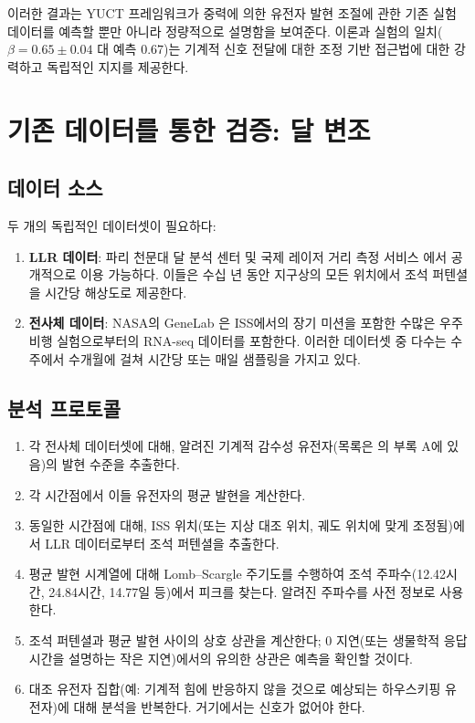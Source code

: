 \documentclass[12pt,a4paper]{article}
\theoremstyle{remark}
\begin{document}
	이러한 결과는 YUCT 프레임워크가 중력에 의한 유전자 발현 조절에 관한 기존 실험 데이터를 예측할 뿐만 아니라 정량적으로 설명함을 보여준다. 이론과 실험의 일치(\(\beta = 0.65 \pm 0.04\) 대 예측 \(0.67\))는 기계적 신호 전달에 대한 조정 기반 접근법에 대한 강력하고 독립적인 지지를 제공한다.
	
	\section{기존 데이터를 통한 검증: 달 변조}
	\label{sec:verification}
	
	\subsection{데이터 소스}
	
	두 개의 독립적인 데이터셋이 필요하다:
	
	\begin{enumerate}
		\item \textbf{LLR 데이터}: 파리 천문대 달 분석 센터 \cite{LLR-POLAC} 및 국제 레이저 거리 측정 서비스 \cite{ILRS}에서 공개적으로 이용 가능하다. 이들은 수십 년 동안 지구상의 모든 위치에서 조석 퍼텐셜을 시간당 해상도로 제공한다.
		\item \textbf{전사체 데이터}: NASA의 GeneLab \cite{NASA-GeneLab}은 ISS에서의 장기 미션을 포함한 수많은 우주 비행 실험으로부터의 RNA-seq 데이터를 포함한다. 이러한 데이터셋 중 다수는 수주에서 수개월에 걸쳐 시간당 또는 매일 샘플링을 가지고 있다.
	\end{enumerate}
	
	\subsection{분석 프로토콜}
	
	\begin{enumerate}
		\item 각 전사체 데이터셋에 대해, 알려진 기계적 감수성 유전자(목록은 \cite{NASA-GeneLab}의 부록 A에 있음)의 발현 수준을 추출한다.
		\item 각 시간점에서 이들 유전자의 평균 발현을 계산한다.
		\item 동일한 시간점에 대해, ISS 위치(또는 지상 대조 위치, 궤도 위치에 맞게 조정됨)에서 LLR 데이터로부터 조석 퍼텐셜을 추출한다.
		\item 평균 발현 시계열에 대해 Lomb–Scargle 주기도를 수행하여 조석 주파수(12.42시간, 24.84시간, 14.77일 등)에서 피크를 찾는다. 알려진 주파수를 사전 정보로 사용한다.
		\item 조석 퍼텐셜과 평균 발현 사이의 상호 상관을 계산한다; 0 지연(또는 생물학적 응답 시간을 설명하는 작은 지연)에서의 유의한 상관은 예측을 확인할 것이다.
		\item 대조 유전자 집합(예: 기계적 힘에 반응하지 않을 것으로 예상되는 하우스키핑 유전자)에 대해 분석을 반복한다. 거기에서는 신호가 없어야 한다.
	\end{enumerate}
	
\end{document}
